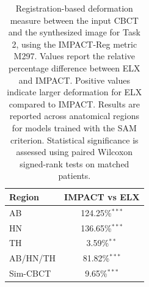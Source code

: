 \begin{table}[h!]
\centering
\footnotesize
\setlength{\tabcolsep}{6pt}
\renewcommand{\arraystretch}{1.25}
\caption{Registration-based deformation measure between the input CBCT and the synthesized image for Task 2, using the IMPACT-Reg metric M297. Values report the relative percentage difference between ELX and IMPACT. Positive values indicate larger deformation for ELX compared to IMPACT. Results are reported across anatomical regions for models trained with the SAM criterion. Statistical significance is assessed using paired Wilcoxon signed-rank tests on matched patients.
}
\label{tab:task2_cv_0_reg_reg_region_metrics}
\begin{tabular}{lc}
\toprule
Region & IMPACT vs ELX \\
\midrule
AB  & 124.25\%$^{***}$ \\
HN & 136.65\%$^{***}$ \\
TH  & 3.59\%$^{**}$ \\
AB/HN/TH & 81.82\%$^{***}$ \\
\addlinespace[0.25em]
\hline
\hline
\addlinespace[0.25em]
Sim-CBCT  & 9.65\%$^{***}$ \\
\bottomrule
\end{tabular}

\end{table}
